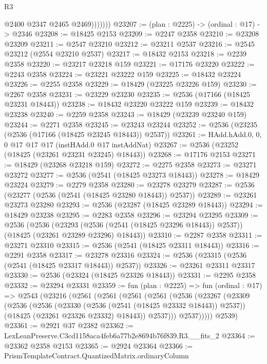 \begin{lexlean}{R3}
\begin{coremodule}
                  @2400
                  @2347
                  @2465
                  @2469)))))))
@23207 := (plan : @2225) -> (ordinal : @17) -> @2346
@23208 := @18425 @2153
@23209 := @2247 @2358
@23210 := @23208 @23209
@23211 := @2547 @23210
@23212 := @23211 @2537
@23216 := @2545 @23212 (@2554 @23210 @2537)
@23217 := @18432 @2153
@23218 := @2239 @2358
@23220 := @23217 @23218 @159
@23221 := @17176 @23220
@23222 := @2243 @2358
@23224 := @23221 @23222 @159
@23225 := @18432 @23224
@23226 := @2255 @2358
@23229 := @18429 (@23225 @23226 @159)
@23230 := @2267 @2358
@23231 := @23229 @23230
@23235 := @2536 (@17166 (@18425 @23231 @18443))
@23238 := @18432 @23220 @23222 @159
@23239 := @18432 @23238
@23240 := @2259 @2358
@23243 := @18429 (@23239 @23240 @159)
@23244 := @2271 @2358
@23245 := @23243 @23244
@23252 := @2536 (@23235 (@2536 (@17166 (@18425 @23245 @18443)) @2537))
@23261 := HAdd.hAdd.{0, 0, 0} @17 @17 @17 (instHAdd.{0} @17 instAddNat)
@23267 := @2536 (@23252 (@18425 (@23261 @23231 @23245) @18443))
@23268 := @17176 @2153
@23271 := @18429 (@23268 @23218 @159)
@23272 := @2275 @2358
@23273 := @23271 @23272
@23277 := @2536 (@2541 (@18425 @23273 @18443))
@23278 := @18429 @23224
@23279 := @2279 @2358
@23280 := @23278 @23279
@23287 := @2536 (@23277 (@2536 (@2541 (@18425 @23280 @18443)) @2537))
@23289 := @23261 @23273 @23280
@23293 := @2536 (@23287 (@18425 @23289 @18443))
@23294 := @18429 @23238
@23295 := @2283 @2358
@23296 := @23294 @23295
@23309 := @2536
    (@2536
      (@23293 (@2536 (@2541 (@18425 @23296 @18443)) @2537))
      (@18425 (@23261 @23289 @23296) @18443))
@23310 := @2287 @2358
@23311 := @23271 @23310
@23315 := @2536 (@2541 (@18425 @23311 @18443))
@23316 := @2291 @2358
@23317 := @23278 @23316
@23324 := @2536 (@23315 (@2536 (@2541 (@18425 @23317 @18443)) @2537))
@23326 := @23261 @23311 @23317
@23330 := @2536 (@23324 (@18425 @23326 @18443))
@23331 := @2295 @2358
@23332 := @23294 @23331
@23359 := fun (plan : @2225) =>
  fun (ordinal : @17) =>
  @2543
    (@23216
      (@2561
        (@2561
          (@2561
            (@2561
              (@2536
                (@23267
                  (@23309
                    (@2536
                      (@2536
                        (@23330 (@2536 (@2541 (@18425 @23332 @18443)) @2537))
                        (@18425 (@23261 @23326 @23332) @18443))
                      @2537)))
                @2537)))))
      @2539)
@23361 := @2921 @37 @2382
@23362 := LexLeanPreserve.C3cd1158aca4feb6a77b2e8694b76f839.R3.__fits_2
@23364 := @23362 @2358 @2153
@23365 := @2924 @23364
@23366 := PrismTemplateContract.QuantizedMatrix.ordinaryColumn

\end{coremodule}
\end{lexlean}
